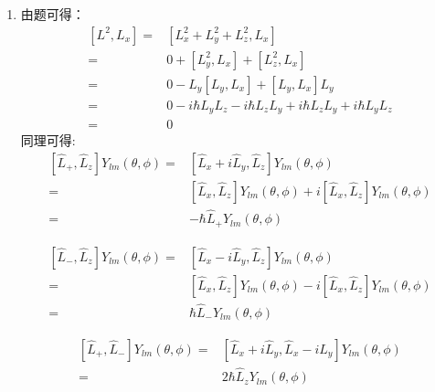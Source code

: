 \begin{enumerate}
\item 由题可得：
\begin{equation}
\begin{aligned}
\left[L^{2},L_{x}\right] =& [ L^{2}_{x} + L^{2}_{y} + L^{2}_{z} , L_{x}] \\
=& 0 + [L^{2}_{y},L_{x}] + [L^{2}_{z},L_{x}] \\
=& 0 - L_y[L_y,L_x]+[L_y,L_x]L_y \\
=& 0 - i\hbar L_y L_z - i\hbar L_z L_y + i\hbar L_z L_y + i\hbar L_y L_z \\
=& 0
\end{aligned}
\end{equation}
同理可得:
\begin{equation}
\begin{aligned}
\left[\hat{L}_+,\hat{L}_z\right]Y_{lm}(\theta ,\phi) =& \left[\hat{L}_{x}+i\hat{L}_{y} ,\hat{L}_z \right]Y_{lm}(\theta ,\phi) \\
=& \left[\hat{L}_x ,\hat{L}_z \right]Y_{lm}(\theta ,\phi) + i\left[\hat{L}_x ,\hat{L}_z \right]Y_{lm}(\theta ,\phi) \\
=& -\hbar \hat{L}_{+}Y_{lm}(\theta ,\phi)
\end{aligned}
\end{equation}

\begin{equation}
\begin{aligned}
\left[\hat{L}_{-},\hat{L}_{z}\right]Y_{lm}(\theta ,\phi) =& \left[\hat{L}_{x}-i\hat{L}_{y} ,\hat{L}_z \right]Y_{lm}(\theta ,\phi) \\
=& \left[\hat{L}_x ,\hat{L}_z \right]Y_{lm}(\theta ,\phi) - i\left[\hat{L}_x ,\hat{L}_z \right]Y_{lm}(\theta ,\phi) \\
=& \hbar \hat{L}_{-}Y_{lm}(\theta ,\phi)
\end{aligned}
\end{equation}

\begin{equation}
\begin{aligned}
\left[\hat{L}_{+},\hat{L}_{-}\right]Y_{lm}(\theta ,\phi) =& \left[\hat{L}_{x} + i\hat{L}_{y} ,\hat{L}_{x}-i\hat{L}_{y} \right]Y_{lm}(\theta ,\phi) \\
=& 2\hbar \hat{L}_{z}Y_{lm}(\theta ,\phi)
\end{aligned}
\end{equation}


\end{enumerate}

